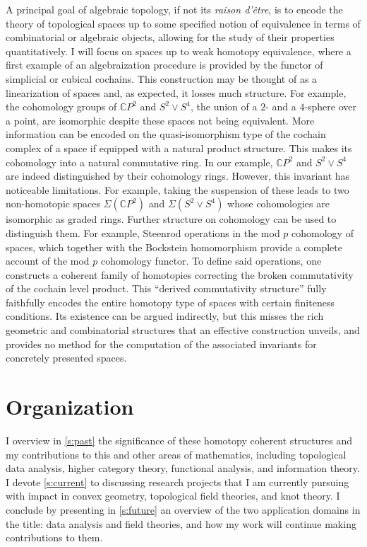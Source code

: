 A principal goal of algebraic topology, if not its \emph{raison d'\^{e}tre}, is to encode the theory of topological spaces up to some specified notion of equivalence in terms of combinatorial or algebraic objects, allowing for the study of their properties quantitatively.
I will focus on spaces up to weak homotopy equivalence, where a first example of an algebraization procedure is provided by the functor of simplicial or cubical cochains.
This construction may be thought of as a linearization of spaces and, as expected, it losses much structure.
For example, the cohomology groups of $\mathbb{C} P^2$ and $S^2 \vee S^4$, the union of a $2$- and a $4$-sphere over a point, are isomorphic despite these spaces not being equivalent.
More information can be encoded on the quasi-isomorphism type of the cochain complex of a space if equipped with a natural product structure.
This makes its cohomology into a natural commutative ring.
In our example, $\mathbb{C} P^2$ and $S^2 \vee S^4$ are indeed distinguished by their cohomology rings.
However, this invariant has noticeable limitations.
For example, taking the suspension of these leads to two non-homotopic spaces $\Sigma(\mathbb{C} P^2)$ and $\Sigma(S^2 \vee S^4)$ whose cohomologies are isomorphic as graded rings.
Further structure on cohomology can be used to distinguish them.
For example, Steenrod operations in the mod $p$ cohomology of spaces, which together with the Bockstein homomorphism provide a complete account of the mod $p$ cohomology functor.
To define said operations, one constructs a coherent family of homotopies correcting the broken commutativity of the cochain level product.
This ``derived commutativity structure'' fully faithfully encodes the entire homotopy type of spaces with certain finiteness conditions.
Its existence can be argued indirectly, but this misses the rich geometric and combinatorial structures that an effective construction unveils, and provides no method for the computation of the associated invariants for concretely presented spaces.

\section*{Organization}

I overview in \cref{s:past} the significance of these homotopy coherent structures and my contributions to this and other areas of mathematics, including topological data analysis, higher category theory, functional analysis, and information theory.
I devote \cref{s:current} to discussing research projects that I am currently pursuing with impact in convex geometry, topological field theories, and knot theory.
I conclude by presenting in \cref{s:future} an overview of the two application domains in the title: data analysis and field theories, and how my work will continue making contributions to them.

